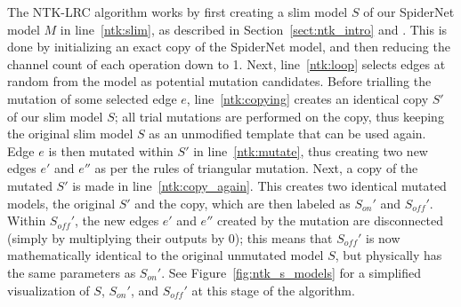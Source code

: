 The NTK-LRC algorithm works by first creating a slim model $S$ of our SpiderNet model $M$ in line~\ref{ntk:slim}, as described in
Section~\ref{sect:ntk_intro} and \cite{chen2021}. This is done by initializing an exact copy of the SpiderNet model,
and then reducing the channel count of each operation down to 1. Next, line~\ref{ntk:loop} selects edges at random from the model
as potential mutation candidates. Before trialling the mutation of some selected edge $e$, line~\ref{ntk:copying} creates
an identical copy $S'$ of our slim model $S$; all trial mutations are performed on the copy, thus keeping
the original slim model $S$ as an unmodified template that can be used again. Edge $e$ is then mutated within $S'$ in line~\ref{ntk:mutate},
thus creating two new edges $e'$ and $e''$ as per the rules of triangular mutation. Next, a copy of the mutated $S'$ is made in
line~\ref{ntk:copy_again}. This creates two identical mutated models, the original $S'$ and the copy, which
are then labeled as $S_{on}'$ and $S_{off}'$. Within $S_{off}'$, the new edges $e'$ and $e''$ created by the mutation are
disconnected (simply by multiplying their outputs by 0); this means that $S_{off}'$ is now mathematically identical
to the original unmutated model $S$, but physically has the same parameters as $S_{on}'$. See Figure~\ref{fig:ntk_s_models}
for a simplified visualization of $S$, $S_{on}'$, and $S_{off}'$ at this stage of the algorithm.
